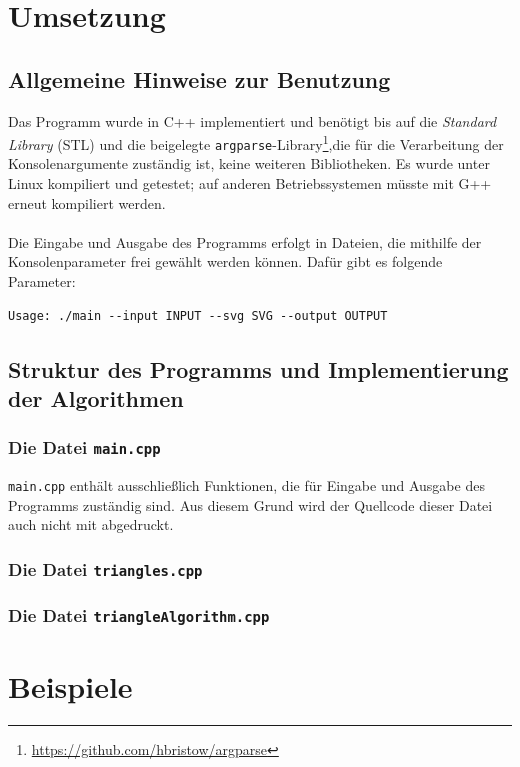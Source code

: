 \documentclass[a4paper, notitlepage, 12pt]{scrartcl}
\begin{document}
\section{Umsetzung}
\subsection{Allgemeine Hinweise zur Benutzung}
Das Programm wurde in C++ implementiert und benötigt bis auf die \textit{Standard Library} (STL) und die beigelegte \texttt{argparse}-Library\footnote{\url{https://github.com/hbristow/argparse}},die für die Verarbeitung der Konsolenargumente zuständig ist, keine weiteren Bibliotheken. Es wurde unter Linux kompiliert und getestet; auf anderen Betriebssystemen müsste mit G++ erneut kompiliert werden. \\ \\
Die Eingabe und Ausgabe des Programms erfolgt in Dateien, die mithilfe der Konsolenparameter frei gewählt werden können. Dafür gibt es folgende Parameter:
\begin{verbatim}
Usage: ./main --input INPUT --svg SVG --output OUTPUT
\end{verbatim}
\subsection{Struktur des Programms und Implementierung der Algorithmen}
\subsubsection{Die Datei \texttt{main.cpp}}
\texttt{main.cpp} enthält ausschließlich Funktionen, die für Eingabe und Ausgabe des Programms zuständig sind. Aus diesem Grund wird der Quellcode dieser Datei auch nicht mit abgedruckt.
\subsubsection{Die Datei \texttt{triangles.cpp}}
\subsubsection{Die Datei \texttt{triangleAlgorithm.cpp}}
\section{Beispiele}
\end{document}
